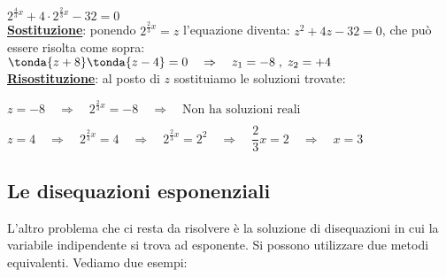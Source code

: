 \begin{esempio} 
\(2^{\frac{4}{3}x} +4 \cdot 2^{\frac{2}{3}x} -32=0\) \\[4pt]
\textbf{\underline{Sostituzione}}:
ponendo \(2^{\frac{2}{3}x}=z\) l'equazione diventa: \(z^2 +4z -32=0\), che può essere
risolta come sopra:
\(\tonda{z+8}\tonda{z-4}=0 \quad \Rightarrow \quad z_1=-8 \;,\; z_2=+4\) 
\\[4pt]
\textbf{\underline{Risostituzione}}: al posto di \(z\) sostituiamo le soluzioni trovate:

\(z = -8\quad \Rightarrow \quad 2^{\frac{2}{3}x}=-8 \quad \Rightarrow \quad \text{Non ha soluzioni reali}\)

\(z = 4\quad \Rightarrow \quad 2^{\frac{2}{3}x}=4 \quad \Rightarrow \quad 2^{\frac{2}{3}x}=2^2
\quad \Rightarrow \quad\dfrac{2}{3}x=2 \quad \Rightarrow \quad x=3\)
\end{esempio}

\subsection{Le disequazioni esponenziali}
\label{subsubsec:esplog_disequazioniesponenziali}

L'altro problema che ci resta da risolvere è la soluzione di disequazioni in 
cui la variabile indipendente si trova ad esponente. 
% 
Si possono utilizzare due metodi equivalenti. Vediamo due esempi:


